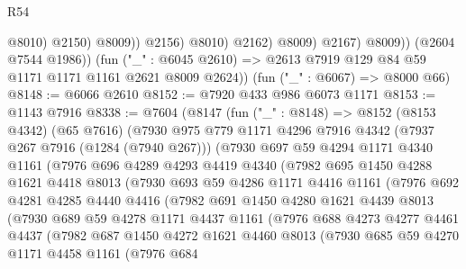 \begin{lexlean}{R54}
\begin{coremodule}
                              @8010)
                            @2150)
                          @8009))
                      @2156)
                    @8010)
                  @2162)
                @8009)
              @2167)
            @8009))
        (@2604 @7544 @1986))
      (fun ("_" : @6045 @2610) => @2613 @7919 @129 @84 @59 @1171 @1171 @1161 @2621 @8009 @2624))
    (fun ("_" : @6067) => @8000 @66)
@8148 := @6066 @2610
@8152 := @7920 @433 @986 @6073 @1171
@8153 := @1143 @7916
@8338 := @7604
    (@8147
      (fun ("_" : @8148) =>
      @8152
        (@8153 @4342)
        (@65 @7616)
        (@7930
          @975
          @779
          @1171
          @4296
          @7916
          @4342
          (@7937 @267 @7916 (@1284 (@7940 @267)))
          (@7930
            @697
            @59
            @4294
            @1171
            @4340
            @1161
            (@7976
              @696
              @4289
              @4293
              @4419
              @4340
              (@7982
                @695
                @1450
                @4288
                @1621
                @4418
                @8013
                (@7930
                  @693
                  @59
                  @4286
                  @1171
                  @4416
                  @1161
                  (@7976
                    @692
                    @4281
                    @4285
                    @4440
                    @4416
                    (@7982
                      @691
                      @1450
                      @4280
                      @1621
                      @4439
                      @8013
                      (@7930
                        @689
                        @59
                        @4278
                        @1171
                        @4437
                        @1161
                        (@7976
                          @688
                          @4273
                          @4277
                          @4461
                          @4437
                          (@7982
                            @687
                            @1450
                            @4272
                            @1621
                            @4460
                            @8013
                            (@7930
                              @685
                              @59
                              @4270
                              @1171
                              @4458
                              @1161
                              (@7976
                                @684

\end{coremodule}
\end{lexlean}
